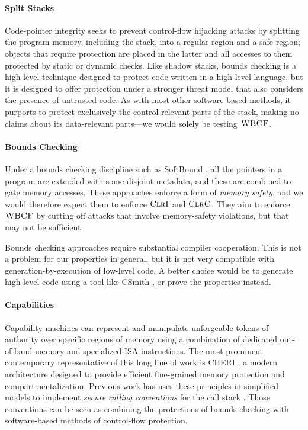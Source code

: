 \documentclass[10pt,conference]{ieeetran}%
\theoremstyle{definition}
\begin{document}
\paragraph{Split Stacks}
%
Code-pointer integrity seeks to prevent control-flow hijacking attacks by
splitting the program memory, including the stack, into a regular region and a
safe region; objects that require protection are placed in the latter and
all accesses to them protected by static or dynamic checks.
%
Like shadow stacks, bounds checking is a high-level technique designed to
protect code written in a high-level language, but it is designed to
offer protection under a stronger threat model that also considers the presence
of untrusted code. As with most other software-based methods, it purports to
protect exclusively the control-relevant parts of the stack, making no claims
about its data-relevant parts---we would solely be testing \(\textnormal{\sc WBCF}\).

\paragraph{Bounds Checking}
%
Under a bounds checking discipline such as SoftBound \cite{NagarakatteZMZ09}, all the pointers
in a program are extended with some disjoint metadata, and these are combined
to gate memory accesses. These approaches enforce a form of \emph{memory safety},
and we would therefore expect them to enforce \(\textnormal{\sc ClrI}\) and \(\textnormal{\sc ClrC}\). They aim
to enforce \(\textnormal{\sc WBCF}\) by cutting off attacks that involve memory-safety violations,
but that may not be sufficient.

Bounds checking approaches require substantial compiler cooperation. This is not a
problem for our properties in general, but it is not very compatible with
generation-by-execution of low-level code. A better choice would be to generate
high-level code using a tool like CSmith \cite{DBLP:conf/pldi/YangCER11}, or prove the properties instead.

\paragraph{Capabilities}

Capability machines can represent and manipulate
unforgeable tokens of authority over specific regions of
memory using a combination of dedicated out-of-band memory and
specialized ISA instructions.
%
The most prominent contemporary representative of this long line of work is
CHERI \cite{DBLP:conf/sp/WatsonWNMACDDGL15}, a modern architecture designed to provide efficient fine-grained
memory protection and compartmentalization.
%
Previous work has uses these principles in simplified models to implement
\emph{secure calling conventions} for the call
stack \cite{SkorstengaardLocal,SkorstengaardSTKJFP,Georges22:TempsDesCerises}. Those conventions can be seen as combining the
protections of bounds-checking with software-based methods of control-flow protection.
\end{document}
